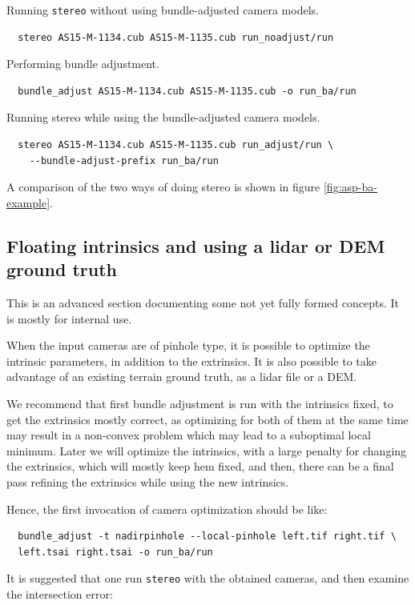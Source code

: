 Running \texttt{stereo} without using bundle-adjusted camera models.
\begin{verbatim}
  stereo AS15-M-1134.cub AS15-M-1135.cub run_noadjust/run
\end{verbatim}

Performing bundle adjustment.
\begin{verbatim}
  bundle_adjust AS15-M-1134.cub AS15-M-1135.cub -o run_ba/run
\end{verbatim}

Running stereo while using the bundle-adjusted camera models.
\begin{verbatim}
  stereo AS15-M-1134.cub AS15-M-1135.cub run_adjust/run \
    --bundle-adjust-prefix run_ba/run
\end{verbatim}

A comparison of the two ways of doing stereo is shown in figure \ref{fig:asp-ba-example}.

\subsection{Floating intrinsics and using a lidar or DEM ground truth}

This is an advanced section documenting some not yet fully formed concepts.
It is mostly for internal use. 

When the input cameras are of pinhole type, it is possible to optimize
the intrinsic parameters, in addition to the extrinsics. It is also
possible to take advantage of an existing terrain ground truth, as a lidar file or a DEM.

We recommend that first bundle adjustment is run with the intrinsics fixed,
to get the extrinsics mostly correct, as optimizing for both of them at
the same time may result in a non-convex problem which may lead to a 
suboptimal local minimum. Later we will optimize the intrinsics, with a large
penalty for changing the extrinsics, which will mostly keep hem fixed, 
and then, there can be a final pass refining the extrinsics while using the new
intrinsics. 

Hence, the first invocation of camera optimization should be like:

\begin{verbatim}
  bundle_adjust -t nadirpinhole --local-pinhole left.tif right.tif \
  left.tsai right.tsai -o run_ba/run
\end{verbatim}

It is suggested that one run \texttt{stereo} with the obtained cameras, 
and then examine the intersection error:

